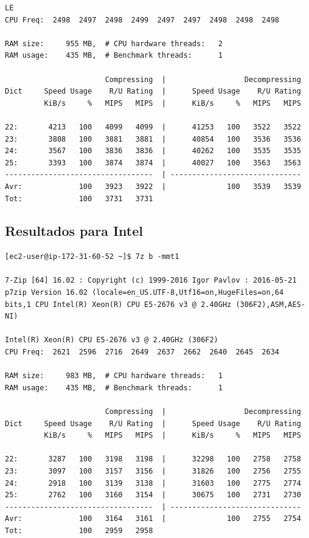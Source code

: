 \documentclass[a4paper,openright,12pt]{article}
\begin{document}
\begin{appendices}
\begin{verbatim}
LE
CPU Freq:  2498  2497  2498  2499  2497  2497  2498  2498  2498

RAM size:     955 MB,  # CPU hardware threads:   2
RAM usage:    435 MB,  # Benchmark threads:      1

                       Compressing  |                  Decompressing
Dict     Speed Usage    R/U Rating  |      Speed Usage    R/U Rating
         KiB/s     %   MIPS   MIPS  |      KiB/s     %   MIPS   MIPS

22:       4213   100   4099   4099  |      41253   100   3522   3522
23:       3808   100   3881   3881  |      40854   100   3536   3536
24:       3567   100   3836   3836  |      40262   100   3535   3535
25:       3393   100   3874   3874  |      40027   100   3563   3563
----------------------------------  | ------------------------------
Avr:             100   3923   3922  |              100   3539   3539
Tot:             100   3731   3731
\end{verbatim}
\newpage
\subsection{Resultados para Intel}
\begin{verbatim}
[ec2-user@ip-172-31-60-52 ~]$ 7z b -mmt1

7-Zip [64] 16.02 : Copyright (c) 1999-2016 Igor Pavlov : 2016-05-21
p7zip Version 16.02 (locale=en_US.UTF-8,Utf16=on,HugeFiles=on,64 bits,1 CPU Intel(R) Xeon(R) CPU E5-2676 v3 @ 2.40GHz (306F2),ASM,AES-NI)

Intel(R) Xeon(R) CPU E5-2676 v3 @ 2.40GHz (306F2)
CPU Freq:  2621  2596  2716  2649  2637  2662  2640  2645  2634

RAM size:     983 MB,  # CPU hardware threads:   1
RAM usage:    435 MB,  # Benchmark threads:      1

                       Compressing  |                  Decompressing
Dict     Speed Usage    R/U Rating  |      Speed Usage    R/U Rating
         KiB/s     %   MIPS   MIPS  |      KiB/s     %   MIPS   MIPS

22:       3287   100   3198   3198  |      32298   100   2758   2758
23:       3097   100   3157   3156  |      31826   100   2756   2755
24:       2918   100   3139   3138  |      31603   100   2775   2774
25:       2762   100   3160   3154  |      30675   100   2731   2730
----------------------------------  | ------------------------------
Avr:             100   3164   3161  |              100   2755   2754
Tot:             100   2959   2958
\end{verbatim}

\end{appendices}
\end{document}
